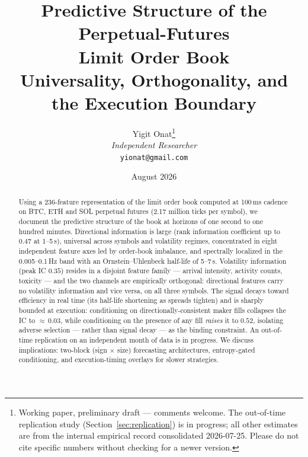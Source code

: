 \documentclass[11pt,a4paper]{article}
\theoremstyle{definition}
\theoremstyle{plain}
\begin{document}

\title{\textbf{Predictive Structure of the Perpetual-Futures\\[3pt]
Limit Order Book}\\[6pt]
\large Universality, Orthogonality, and the Execution Boundary}

\author{Yigit Onat\thanks{Working paper, preliminary draft --- comments
welcome. The out-of-time replication study
(Section~\ref{sec:replication}) is in progress; all other estimates are
from the internal empirical record consolidated 2026-07-25. Please do
not cite specific numbers without checking for a newer version.}\\
\textit{Independent Researcher}\\
\texttt{yionat@gmail.com}}
\date{August 2026}
\maketitle

\begin{abstract}
Using a 236-feature representation of the limit order book computed at
100\,ms cadence on BTC, ETH and SOL perpetual futures (2.17 million
ticks per symbol), we document the predictive structure of the book at
horizons of one second to one hundred minutes. Directional information
is large (rank information coefficient up to $0.47$ at 1--5\,s),
universal across symbols and volatility regimes, concentrated in eight
independent feature axes led by order-book imbalance, and spectrally
localized in the 0.005--0.1\,Hz band with an Ornstein--Uhlenbeck
half-life of 5--7\,s. Volatility information (peak IC $0.35$) resides
in a disjoint feature family --- arrival intensity, activity counts,
toxicity --- and the two channels are empirically orthogonal:
directional features carry no volatility information and vice versa,
on all three symbols. The signal decays toward efficiency in real time
(its half-life shortening as spreads tighten) and is sharply bounded
at execution: conditioning on directionally-consistent maker fills
collapses the IC to ${\approx}\,0.03$, while conditioning on the
presence of any fill \emph{raises} it to $0.52$, isolating adverse
selection --- rather than signal decay --- as the binding constraint.
An out-of-time replication on an independent month of data is in
progress. We discuss implications: two-block (sign $\times$ size)
forecasting architectures, entropy-gated conditioning, and
execution-timing overlays for slower strategies.
\end{abstract}
\end{document}

